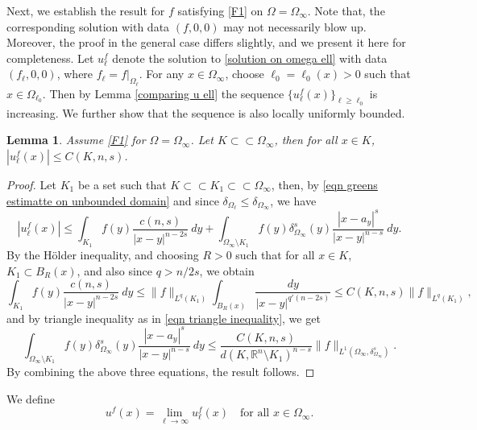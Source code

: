 \documentclass{amsart}
\newtheorem{lemma}[theorem]{Lemma}
\newcommand{\R}{\mathbb{R}}
\newcommand{\ul}{u_{\ell}}
\begin{document}
Next, we establish the result for $f$ satisfying \ref{F1} on $\Omega=\Omega_{\infty}$. Note that, the corresponding solution with data $(f,0,0)$ may not necessarily blow up. Moreover, the proof in the general case differs slightly, and we present it here for completeness. Let $u^{f}_{\ell}$ denote the solution to \eqref{solution on omega ell} with data $(f_{\ell},0,0)$, where $f_{\ell}=f|_{\Omega_{\ell}}$. For any $x\in \Omega_{\infty}$, choose $\ell_{0}=\ell_{0}(x)>0$ such that $x\in \Omega_{\ell_{0}}$. Then by Lemma \ref{comparing u ell} the sequence $\{u^{f}_{\ell}(x)\}_{\ell\geq \ell_{0}}$ is increasing. We further show that the sequence is also locally uniformly bounded.
\begin{lemma}
  Assume \ref{F1} for $\Omega=\Omega_{\infty}$. Let $K\subset\subset\Omega_{\infty}$, then for all $x\in K$, $|u_{\ell}^{f}(x)|\leq C(K,n,s)$.
\end{lemma}
\begin{proof}
    Let $K_{1}$ be a set such that $K\subset\subset K_{1}\subset\subset\Omega_{\infty}$, then, by \eqref{eqn greens estimatte on unbounded domain} and since $\delta_{\Omega_{\ell}}\leq \delta_{\Omega_{\infty}}$, we have
    \begin{equation*}
        |u^{f}_{\ell}(x)|\leq \int_{K_{1}}f(y)\frac{c(n,s)}{|x-y|^{n-2s}}\ dy+\int_{\Omega_{\infty}\setminus K_{1}}f(y)\delta_{\Omega_{\infty}}^{s}(y)\frac{|x-a_y|^{s}}{|x-y|^{n-s}} \ dy.
 \end{equation*}
 By the H\"older inequality, and choosing $R>0$ such that for all $x\in K$, $K_{1}\subset B_{R}(x)$, and also since $q>n/2s$, we obtain
 \begin{equation*}
     \int_{K_{1}}f(y)\frac{c(n,s)}{|x-y|^{n-2s}}\ dy\leq \|f\|_{L^{q}(K_{1})}\int_{B_{R}(x)}\frac{dy}{|x-y|^{q'(n-2s)}}\leq C(K,n,s)\|f\|_{L^{q}(K_{1})},
 \end{equation*}
 and by triangle inequality as in \eqref{eqn triangle inequality}, we get
 \begin{equation*}
     \int_{\Omega_{\infty}\setminus K_{1}}f(y)\delta_{\Omega_{\infty}}^{s}(y)\frac{|x-a_y|^{s}}{|x-y|^{n-s}} \ dy\leq \frac{C(K,n,s)}{d(K,\R^{n}\setminus K_{1})^{n-s}}\|f\|_{L^{1}(\Omega_{\infty},\delta_{\Omega_{\infty}}^{s})}.
 \end{equation*}
 By combining the above three equations, the result follows.
\end{proof}

We define
\begin{equation}\label{dfn of uf in linear case}
    u^{f}(x)=\lim_{\ell\to\infty}\ul^{f}(x) \quad \text{for all }x\in \Omega_{\infty}.
\end{equation}
\end{document}
